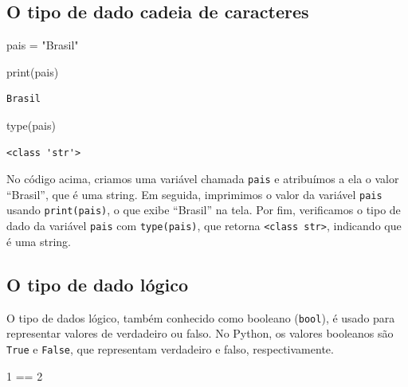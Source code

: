 \documentclass[
  portuguese,
  letterpaper,
  DIV=11,
  numbers=noendperiod]{scrreprt}
\newenvironment{Shaded}{\begin{snugshade}}{\end{snugshade}}
\newcommand{\BuiltInTok}[1]{\textcolor[rgb]{0.00,0.23,0.31}{#1}}
\newcommand{\DecValTok}[1]{\textcolor[rgb]{0.68,0.00,0.00}{#1}}
\newcommand{\NormalTok}[1]{\textcolor[rgb]{0.00,0.23,0.31}{#1}}
\newcommand{\OperatorTok}[1]{\textcolor[rgb]{0.37,0.37,0.37}{#1}}
\newcommand{\StringTok}[1]{\textcolor[rgb]{0.13,0.47,0.30}{#1}}
\theoremstyle{definition}
\theoremstyle{remark}
\begin{document}
\subsection{O tipo de dado cadeia de
caracteres}\label{o-tipo-de-dado-cadeia-de-caracteres}

\begin{Shaded}
\begin{Highlighting}[]
\NormalTok{pais }\OperatorTok{=} \StringTok{"Brasil"} 

\BuiltInTok{print}\NormalTok{(pais)}
\end{Highlighting}
\end{Shaded}

\begin{verbatim}
Brasil
\end{verbatim}

\begin{Shaded}
\begin{Highlighting}[]
\BuiltInTok{type}\NormalTok{(pais)}
\end{Highlighting}
\end{Shaded}

\begin{verbatim}
<class 'str'>
\end{verbatim}

No código acima, criamos uma variável chamada \texttt{pais} e atribuímos
a ela o valor ``Brasil'', que é uma string. Em seguida, imprimimos o
valor da variável \texttt{pais} usando \texttt{print(pais)}, o que exibe
``Brasil'' na tela. Por fim, verificamos o tipo de dado da variável
\texttt{pais} com \texttt{type(pais)}, que retorna
\texttt{\textless{}class\ \textquotesingle{}str\textquotesingle{}\textgreater{}},
indicando que é uma string.

\subsection{O tipo de dado lógico}\label{o-tipo-de-dado-luxf3gico-1}

O tipo de dados lógico, também conhecido como booleano (\texttt{bool}),
é usado para representar valores de verdadeiro ou falso. No Python, os
valores booleanos são \texttt{True} e \texttt{False}, que representam
verdadeiro e falso, respectivamente.

\begin{Shaded}
\begin{Highlighting}[]
\DecValTok{1} \OperatorTok{==} \DecValTok{2}
\end{Highlighting}
\end{Shaded}
\end{document}

